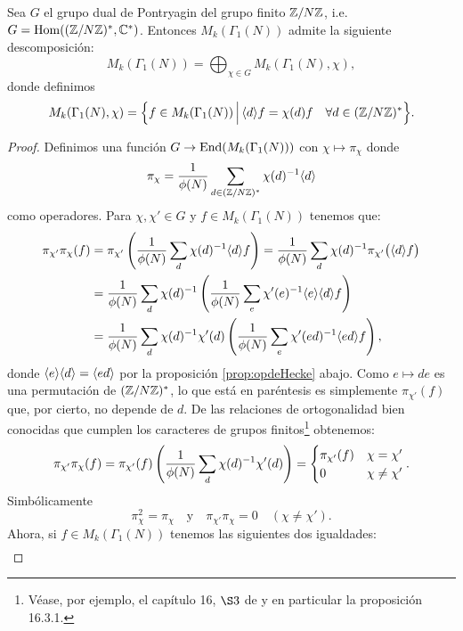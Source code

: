 \begin{prop}\label{prop:chieigenespacios}
  Sea $G$ el grupo dual de Pontryagin del grupo finito $\mathbb{Z}/N\mathbb{Z}$, i.e.  $G=\mathrm{Hom}((\mathbb{Z}/N\mathbb{Z})^*,\mathbb{C}^*)$.
  Entonces $M_k(\Gamma_1(N))$ admite la siguiente descomposici\'on:
  \[
    M_k(\Gamma_1(N))=\bigoplus_{\chi\in G}M_k(\Gamma_1(N),\chi),
  \]
  donde definimos
  \[
    M_k(\Gamma_1(N),\chi)=
    \Big\{f\in M_k(\Gamma_1(N)) \,\Big|\, \langle d \rangle f=\chi(d)f\quad\forall d\in(\mathbb{Z}/N\mathbb{Z})^*\Big\}.
  \]
\end{prop}
\begin{proof}
  Definimos una funci\'on $G\rightarrow\mathrm{End}(M_k(\Gamma_1(N)))$ con $\chi\mapsto \pi_{\chi}$ donde
  \[
    \pi_{\chi}=\frac{1}{\phi(N)}\sum_{d\in(\mathbb{Z}/N\mathbb{Z})^*}\chi(d)^{-1}\langle d \rangle
  \]
  como operadores. Para $\chi,\chi'\in G$ y $f\in M_k(\Gamma_1(N))$ tenemos que:
  \begin{align*}
    \pi_{\chi'}\pi_{\chi}(f)
    &=\pi_{\chi'}\left( \frac{1}{\phi(N)}\sum_d\chi(d)^{-1}\langle d \rangle f \right)
      =\frac{1}{\phi(N)}\sum_d\chi(d)^{-1}\pi_{\chi'}\big(\langle d \rangle f\big)\\
    &=\frac{1}{\phi(N)}\sum_d\chi(d)^{-1}\left( \frac{1}{\phi(N)}\sum_e\chi'(e)^{-1}\langle e \rangle\langle d \rangle f \right)\\
    &=\frac{1}{\phi(N)}\sum_d\chi(d)^{-1}\chi'(d)
      \left( \frac{1}{\phi(N)}\sum_e\chi'(ed)^{-1}\langle ed \rangle f \right),
  \end{align*}
  donde $\langle e \rangle\langle d \rangle=\langle ed \rangle$ por la proposici\'on \ref{prop:opdeHecke} abajo.  
  Como $e\mapsto de$ es una permutaci\'on de $(\mathbb{Z}/N\mathbb{Z})^*$, lo que est\'a en par\'entesis es
  simplemente $\pi_{\chi'}(f)$ que, por cierto, no depende de $d$. De las relaciones de
  ortogonalidad bien conocidas que cumplen los caracteres de grupos finitos\footnote{V\'ease, por ejemplo,
    el cap\'itulo 16, $\S3$ de \cite{IrelandRosenACITMNT} y en particular la proposici\'on 16.3.1.}
  obtenemos:
  \[
    \pi_{\chi'}\pi_{\chi}(f)=\pi_{\chi'}(f)\left( \frac{1}{\phi(N)}\sum_d\chi(d)^{-1}\chi'(d) \right)=
    \begin{cases}
      \pi_{\chi'}(f) &\chi=\chi'\\
      0 &\chi\neq\chi'
    \end{cases}.
  \]
  Simb\'olicamente
  \begin{equation}
    \label{eq:proyeccionpichi}
    \pi_{\chi}^2=\pi_{\chi}\quad\text{y}\quad \pi_{\chi'}\pi_{\chi}=0 \quad (\chi\neq\chi').
  \end{equation}
  Ahora, si $f\in M_k(\Gamma_1(N))$ tenemos las siguientes dos igualdades:
  \begin{align*}

\end{align*}
\end{proof}

